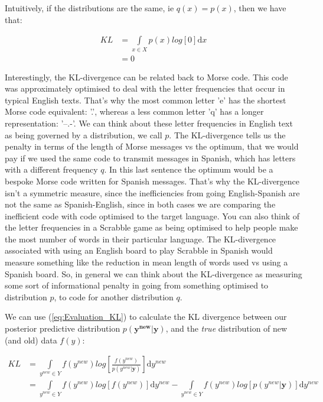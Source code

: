 \documentclass[11pt,fullpage]{book}
\begin{document}
Intuitively, if the distributions are the same, ie $q(x)=p(x)$, then we have that:

\begin{equation}
\begin{align}
KL &= \int\limits_{x\in X} p(x) log\left[0\right]\mathrm{d}x\\
&= 0
\end{align}
\end{equation}

Interestingly, the KL-divergence can be related back to Morse code. This code was approximately optimised to deal with the letter frequencies that occur in typical English texts. That's why the most common letter 'e' has the shortest Morse code equivalent: '.', whereas a less common letter 'q' has a longer representation: '--.-'. We can think about these letter frequencies in English text as being governed by a distribution, we call $p$. The KL-divergence tells us the penalty in terms of the length of Morse messages vs the optimum, that we would pay if we used the same code to transmit messages in Spanish, which has letters with a different frequency $q$. In this last sentence the optimum would be a bespoke Morse code written for Spanish messages. That's why the KL-divergence isn't a symmetric measure, since the inefficiencies from going English-Spanish are not the same as Spanish-English, since in both cases we are comparing the inefficient code with code optimised to the target language. You can also think of the letter frequencies in a Scrabble game as being optimised to help people make the most number of words in their particular language. The KL-divergence associated with using an English board to play Scrabble in Spanish would measure something like the reduction in mean length of words used vs using a Spanish board. So, in general we can think about the KL-divergence as measuring some sort of informational penalty in going from something optimised to distribution $p$, to code for another distribution $q$.

We can use (\ref{eq:Evaluation_KL}) to calculate the KL divergence between our posterior predictive distribution $p(\boldsymbol{y^{new}}|\boldsymbol{y})$, and the \textit{true} distribution of new (and old) data $f(y)$:

\begin{equation}\label{eq:Evaluation_KLelpdDeriv}
\begin{align}
KL &= \int\limits_{y^{new}\in Y} f(y^{new}) log\left[\frac{f(y^{new})}{p(y^{new}|\boldsymbol{y})}\right]\mathrm{d}y^{new}\\
&= \int\limits_{y^{new}\in Y} f(y^{new}) log\left[f(y^{new})\right]\mathrm{d}y^{new} - \int\limits_{y^{new}\in Y} f(y^{new}) log\left[p(y^{new}|\boldsymbol{y})\right]\mathrm{d}y^{new}
\end{align}
\end{equation}
\end{document}
